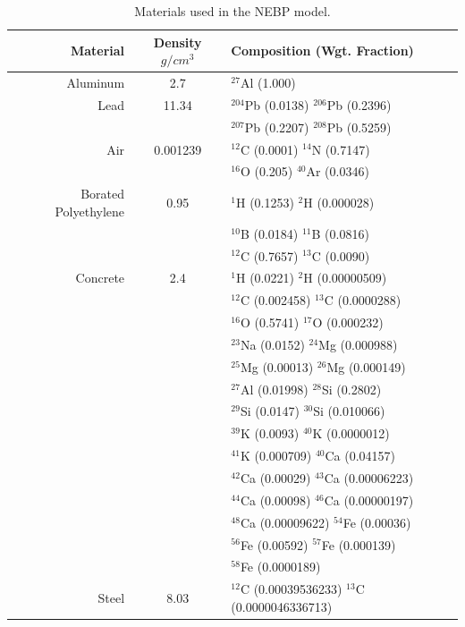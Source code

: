 \begin{table}[h]\centering
\caption{Materials used in the NEBP model.}
\begin{tabular}{ r c l }
\toprule
\textbf{Material} & \textbf{Density} $g/cm^3$ & \textbf{Composition (Wgt. Fraction)} \\
\midrule
Aluminum & 2.7 & $^{27}$Al (1.000) \\
\midrule
Lead & 11.34 & $^{204}$Pb (0.0138)  $^{206}$Pb (0.2396) \\
        & & $^{207}$Pb (0.2207)  $^{208}$Pb (0.5259) \\
\midrule
Air & 0.001239 & $^{12}$C (0.0001)  $^{14}$N (0.7147) \\
        & & $^{16}$O (0.205)  $^{40}$Ar (0.0346) \\
\midrule
Borated Polyethylene & 0.95 & $^{1}$H (0.1253)  $^{2}$H (0.000028) \\
                       &  & $^{10}$B (0.0184)   $^{11}$B (0.0816) \\
                       &  & $^{12}$C (0.7657)   $^{13}$C (0.0090) \\
\midrule
Concrete & 2.4 &  $^{1}$H (0.0221) $^{2}$H (0.00000509) \\
& &         $^{12}$C (0.002458)  $^{13}$C (0.0000288) \\
& &           $^{16}$O (0.5741)  $^{17}$O (0.000232) \\
& &          $^{23}$Na (0.0152)   $^{24}$Mg (0.000988) \\
& &          $^{25}$Mg (0.00013)   $^{26}$Mg (0.000149) \\
& &          $^{27}$Al (0.01998)   $^{28}$Si (0.2802) \\
& &          $^{29}$Si (0.0147)  $^{30}$Si (0.010066) \\
& &          $^{39}$K (0.0093)   $^{40}$K (0.0000012) \\
& &          $^{41}$K (0.000709)  $^{40}$Ca (0.04157) \\
& &          $^{42}$Ca (0.00029)    $^{43}$Ca (0.00006223) \\
& &          $^{44}$Ca (0.00098)   $^{46}$Ca (0.00000197) \\
& &          $^{48}$Ca (0.00009622)    $^{54}$Fe (0.00036) \\
& &          $^{56}$Fe (0.00592)   $^{57}$Fe (0.000139) \\
& &          $^{58}$Fe (0.0000189) \\
\midrule
Steel & 8.03 & $^{12}$C (0.00039536233)  $^{13}$C (0.0000046336713) \\

\end{tabular}
\end{table}
